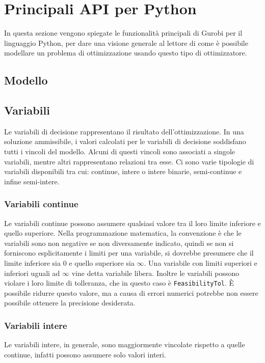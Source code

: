 \section{Principali API per Python}
In questa sezione vengono spiegate le funzionalità principali di Gurobi per il linguaggio Python, per dare una visione generale al lettore di come è possibile modellare un problema di ottimizzazione usando questo tipo di ottimizzatore.



\subsection{Modello}



\subsection{Variabili}
Le variabili di decisione rappresentano il risultato dell'ottimizzazione.
In una soluzione ammissibile, i valori calcolati per le variabili di decisione soddisfano tutti i vincoli del modello. Alcuni di questi vincoli sono associati a singole variabili, mentre altri rappresentano relazioni tra esse.
Ci sono varie tipologie di variabili disponibili tra cui: continue, intere o intere binarie, semi-continue e infine semi-intere.

\subsubsection*{Variabili continue}
Le variabili continue possono assumere qualsiasi valore tra il loro limite inferiore e quello superiore. Nella programmazione matematica, la convenzione è che le variabili sono non negative se non diversamente indicato, quindi se non si forniscono esplicitamente i limiti per una variabile, si dovrebbe presumere che il limite inferiore sia 0 e quello superiore sia $\infty$. Una variabile con limiti superiori e inferiori uguali ad $\infty$ vine detta variabile libera.
Inoltre le variabili possono violare i loro limite di tolleranza, che in questo caso è \texttt{FeasibilityTol}. È possibile ridurre questo valore, ma a causa di errori numerici potrebbe non essere possibile ottenere la precisione desiderata.

\subsubsection*{Variabili intere}
Le variabili intere, in generale, sono maggiormente vincolate rispetto a quelle continue, infatti possono assumere solo valori interi. 

